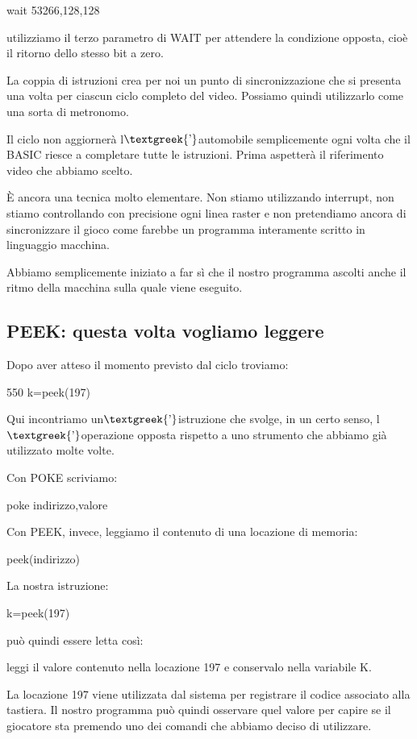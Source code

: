 \documentclass{article}
\begin{document}
wait 53266,128,128

utilizziamo il terzo parametro di WAIT per attendere la condizione opposta, cioè il ritorno dello stesso bit a zero.

La coppia di istruzioni crea per noi un punto di sincronizzazione che si presenta una volta per ciascun ciclo completo
del video. Possiamo quindi utilizzarlo come una sorta di metronomo.

Il ciclo non aggiornerà l$\text{\textgreek{’}}$automobile semplicemente ogni volta che il BASIC riesce a completare
tutte le istruzioni. Prima aspetterà il riferimento video che abbiamo scelto.

È ancora una tecnica molto elementare. Non stiamo utilizzando interrupt, non stiamo controllando con precisione ogni
linea raster e non pretendiamo ancora di sincronizzare il gioco come farebbe un programma interamente scritto in
linguaggio macchina.

Abbiamo semplicemente iniziato a far sì che il nostro programma ascolti anche il ritmo della macchina sulla quale viene
eseguito.

\subsection{PEEK: questa volta vogliamo leggere}
Dopo aver atteso il momento previsto dal ciclo troviamo:

550 k=peek(197)

Qui incontriamo un$\text{\textgreek{’}}$istruzione che svolge, in un certo senso, l$\text{\textgreek{’}}$operazione
opposta rispetto a uno strumento che abbiamo già utilizzato molte volte.

Con POKE scriviamo:

poke indirizzo,valore

Con PEEK, invece, leggiamo il contenuto di una locazione di memoria:

peek(indirizzo)

La nostra istruzione:

k=peek(197)

può quindi essere letta così:

leggi il valore contenuto nella locazione 197 e conservalo nella variabile K.

La locazione 197 viene utilizzata dal sistema per registrare il codice associato alla tastiera. Il nostro programma può
quindi osservare quel valore per capire se il giocatore sta premendo uno dei comandi che abbiamo deciso di utilizzare.
\end{document}
